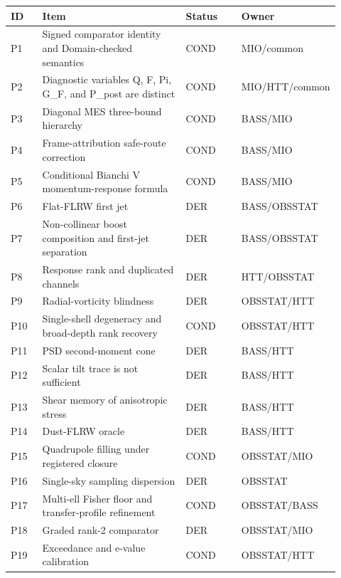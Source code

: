 \documentclass[11pt]{article}
\begin{document}
{\footnotesize
\begin{longtable}{>{\raggedright\arraybackslash}p{0.10\linewidth} >{\raggedright\arraybackslash}p{0.50\linewidth} >{\raggedright\arraybackslash}p{0.18\linewidth} >{\raggedright\arraybackslash}p{0.14\linewidth}}
\toprule
ID & Item & Status & Owner\\
\midrule
P1 & Signed comparator identity and Domain-checked semantics & COND & MIO/\allowbreak{}common\\
P2 & Diagnostic variables Q, F, Pi, G\_F, and P\_post are distinct & COND & MIO/\allowbreak{}HTT/\allowbreak{}common\\
P3 & Diagonal MES three-bound hierarchy & COND & BASS/\allowbreak{}MIO\\
P4 & Frame-attribution safe-route correction & COND & BASS/\allowbreak{}MIO\\
P5 & Conditional Bianchi V momentum-response formula & COND & BASS/\allowbreak{}MIO\\
P6 & Flat-FLRW first jet & DER & BASS/\allowbreak{}OBSSTAT\\
P7 & Non-collinear boost composition and first-jet separation & DER & BASS/\allowbreak{}OBSSTAT\\
P8 & Response rank and duplicated channels & DER & HTT/\allowbreak{}OBSSTAT\\
P9 & Radial-vorticity blindness & DER & OBSSTAT/\allowbreak{}HTT\\
P10 & Single-shell degeneracy and broad-depth rank recovery & COND & OBSSTAT/\allowbreak{}HTT\\
P11 & PSD second-moment cone & DER & BASS/\allowbreak{}HTT\\
P12 & Scalar tilt trace is not sufficient & DER & BASS/\allowbreak{}HTT\\
P13 & Shear memory of anisotropic stress & DER & BASS/\allowbreak{}HTT\\
P14 & Dust-FLRW oracle & DER & BASS/\allowbreak{}HTT\\
P15 & Quadrupole filling under registered closure & COND & OBSSTAT/\allowbreak{}MIO\\
P16 & Single-sky sampling dispersion & DER & OBSSTAT\\
P17 & Multi-ell Fisher floor and transfer-profile refinement & COND & OBSSTAT/\allowbreak{}BASS\\
P18 & Graded rank-2 comparator & DER & OBSSTAT/\allowbreak{}MIO\\
P19 & Exceedance and e-value calibration & COND & OBSSTAT/\allowbreak{}HTT\\

\end{longtable}}
\end{document}
